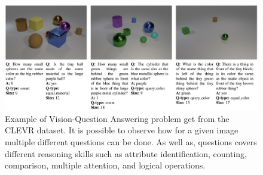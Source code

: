 \begin{figure}[t]
    \centering
    \includegraphics[width=1.0\textwidth]{figures/images/ch2/vqa_problem.jpg}
    \caption{Example of Vision-Question Answering problem get from the CLEVR \cite{johnson2017clevr} dataset. It is possible to observe how for a given image multiple different questions can be done. As well as, questions covers different reasoning skills such as attribute identification, counting, comparison, multiple attention, and logical operations.}
    \label{fig:vqa_example}
\end{figure}
